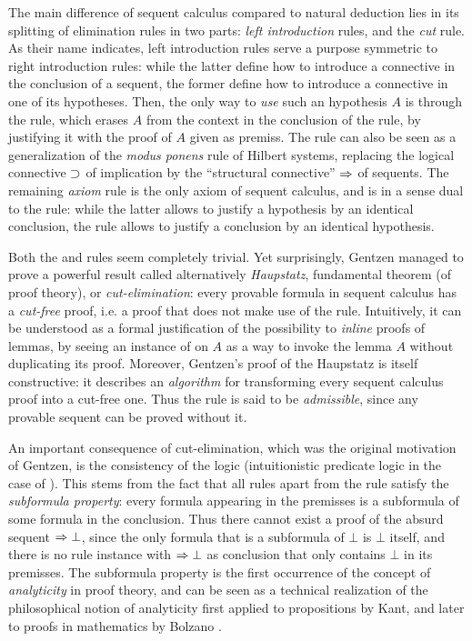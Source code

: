 The main difference of sequent calculus compared to natural deduction lies in
its splitting of elimination rules in two parts: \emph{left introduction} rules,
and the \emph{cut} rule. As their name indicates, left introduction rules serve
a purpose symmetric to right introduction rules: while the latter define how to
introduce a connective in the conclusion of a sequent, the former define how to
introduce a connective in one of its hypotheses. Then, the only way to
\emph{use} such an hypothesis $A$ is through the  rule, which erases
$A$ from the context in the conclusion of the rule, by justifying it with the
proof of $A$ given as premiss. The  rule can also be seen as a
generalization of the \textit{modus ponens} rule of Hilbert systems, replacing
the logical connective $\supset$ of implication by the ``structural connective''
$\Rightarrow$ of sequents. The remaining \emph{axiom} rule  is the only axiom
of sequent calculus, and is in a sense dual to the  rule: while the
latter allows to justify a hypothesis by an identical conclusion, the 
rule allows to justify a conclusion by an identical hypothesis.

Both the  and  rules seem completely trivial. Yet surprisingly,
Gentzen managed to prove a powerful result called alternatively
\textit{Haupstatz}, fundamental theorem (of proof theory), or
\emph{cut-elimination}: every provable formula in sequent calculus has a
\emph{cut-free} proof, i.e. a proof that does not make use of the 
rule. Intuitively, it can be understood as a formal justification of the
possibility to \emph{inline} proofs of lemmas, by seeing an instance of
 on $A$ as a way to invoke the lemma $A$ without duplicating its proof.
Moreover, Gentzen's proof of the Haupstatz is itself constructive: it describes
an \emph{algorithm} for transforming every sequent calculus proof into a
cut-free one. Thus the  rule is said to be \emph{admissible}, since any
provable sequent can be proved without it.

An important consequence of cut-elimination, which was the original motivation
of Gentzen, is the consistency of the logic (intuitionistic predicate logic in
the case of ). This stems from the fact that all rules apart from the
 rule satisfy the \emph{subformula property}: every formula appearing
in the premisses is a subformula of some formula in the conclusion. Thus there
cannot exist a proof of the absurd sequent $\Rightarrow \bot$, since the only formula
that is a subformula of $\bot$ is $\bot$ itself, and there is no rule instance
with $\Rightarrow \bot$ as conclusion that only contains $\bot$ in its premisses. The
subformula property is the first occurrence of the concept of \emph{analyticity}
in proof theory, and can be seen as a technical realization of the philosophical
notion of analyticity first applied to propositions by Kant, and later to proofs
in mathematics by Bolzano .

